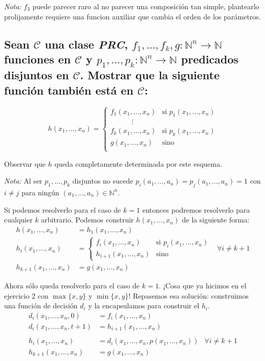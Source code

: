 \documentclass[fleqn, 11pt]{article}
\newcommand{\nat}{\mathbb{N}}
\newcommand{\Ccur}{\mathcal{C}}
\begin{document}
\emph{Nota:} $f_3$ puede parecer raro al no parecer una composición tan simple,
plantearlo prolijamente requiere una funcion auxiliar que cambia el orden de
los parámetros.

\subsection{Sean $\Ccur$ una clase \emph{PRC}, $f_1, \dots, f_k,
g:\nat^n\to\nat$ funciones en $\Ccur$ y $p_1, \dots, p_k:\nat^n\to\nat$
predicados disjuntos en $\Ccur$. Mostrar que la siguiente función también está
en $\Ccur$:}

\[
	h(x_1, \dots, x_n) =
	\begin{cases}
		f_1(x_1, \dots, x_n) & \text{si } p_1(x_1, \dots, x_n) \\
		\hspace{3em}\vdots \\
		f_k(x_1, \dots, x_n) & \text{si } p_k(x_1, \dots, x_n) \\
		g(x_1, \dots, x_n) & \text{sino} \\
	\end{cases}
\]

Observar que $h$ queda completamente determinada por este esquema.

\emph{Nota:} Al ser $p_1, \dots, p_k$ disjuntos no sucede $p_i(a_1, \dots, a_n)
= p_j(a_1, \dots, a_n) = 1$ con $i \neq j$ para ningún
$(a_1, \dots, a_n) \in \nat^n$.

Si podemos resolverlo para el caso de $k=1$ entonces podremos resolverlo para
cualquier $k$ arbitrario. Podemos construir $h(x_1, \dots, x_n)$ de la
siguiente forma:
\begin{align*}
	h(x_1, \dots, x_n)   &= h_1(x_1, \dots, x_n) \\
	h_i(x_1, \dots, x_n) &=
	\begin{cases}
		f_i(x_1, \dots, x_n) & \text{si } p_i(x_1, \dots, x_n) \\
		h_{i + 1}(x_1, \dots, x_n) & \text{sino}
	\end{cases} & \forall i \neq k+1 \\
	h_{k + 1}(x_1, \dots, x_n) &= g(x_1, \dots, x_n)
\end{align*}

Ahora sólo queda resolverlo para el caso de $k = 1$. ¡Cosa que ya hicimos en el
ejercicio 2 con $\max\{x, y\}$ y $\min\{x, y\}$! Repasemos esa solución:
construimos una función de decisión $d_i$ y la encapsulamos para construir el
$h_i$.
\begin{align*}
	d_i(x_1, \dots, x_n, 0)     &= f_i(x_1, \dots, x_n) \\
	d_i(x_1, \dots, x_n, t + 1) &= h_{i + 1}(x_1, \dots, x_n) \\
	\\
	h_i(x_1, \dots, x_n)        &= d_i(x_1, \dots, x_n, p(x_1, \dots, x_n))
	& \forall i \neq k+1 \\
	h_{k+1}(x_1, \dots, x_n)    &= g(x_1, \dots, x_n)
\end{align*}
\end{document}
